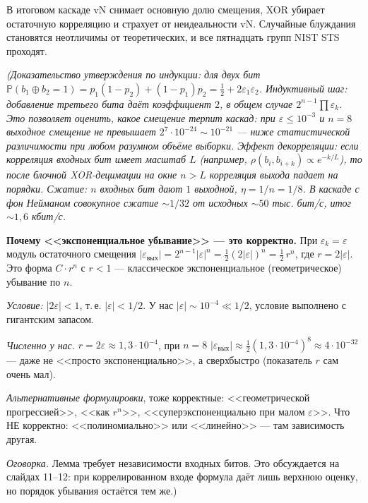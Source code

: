 \documentclass[12pt,a4paper]{extarticle}
\newcommand{\note}[1]{%
  \par
  {\small\color{noteclr}\itshape (#1)}%
  \par}
\begin{document}
В итоговом каскаде vN снимает основную долю смещения, XOR убирает
остаточную корреляцию и страхует от неидеальности vN. Случайные блуждания
становятся неотличимы от теоретических, и все пятнадцать групп NIST STS
проходят.

\note{Доказательство утверждения по индукции: для двух бит
$\mathbb{P}(b_1\oplus b_2=1)=p_1(1-p_2)+(1-p_1)p_2=
\tfrac12+2\varepsilon_1\varepsilon_2$. Индуктивный шаг: добавление третьего
бита даёт коэффициент $2$, в общем случае $2^{n-1}\prod\varepsilon_k$.
Это позволяет оценить, какое смещение терпит каскад: при $\varepsilon\le
10^{-3}$ и $n=8$ выходное смещение не превышает $2^7\cdot 10^{-24}\sim
10^{-21}$ --- ниже статистической различимости при любом разумном объёме
выборки. Эффект декорреляции: если корреляция входных бит имеет масштаб
$L$ (например, $\rho(b_i,b_{i+k})\propto e^{-k/L}$), то после блочной
XOR-децимации на окне $n>L$ корреляция выхода падает на порядки.
Сжатие: $n$ входных бит дают $1$ выходной, $\eta=1/n=1/8$. В каскаде с
фон Нейманом совокупное сжатие $\sim 1/32$ от исходных $\sim 50$ тыс. бит/с,
итог $\sim 1{,}6$ кбит/с.

\medskip
\textbf{Почему <<экспоненциальное убывание>> --- это корректно.}
При $\varepsilon_k=\varepsilon$ модуль остаточного смещения
$|\varepsilon_{\mathrm{вых}}|=2^{n-1}|\varepsilon|^n
=\tfrac12(2|\varepsilon|)^n=\tfrac12\,r^n$, где $r=2|\varepsilon|$.
Это форма $C\cdot r^n$ с $r<1$ --- классическое экспоненциальное
(геометрическое) убывание по $n$.

\emph{Условие:} $|2\varepsilon|<1$, т.\,е. $|\varepsilon|<1/2$. У нас
$|\varepsilon|\sim 10^{-4}\ll 1/2$, условие выполнено с гигантским запасом.

\emph{Численно у нас.} $r=2\varepsilon\approx 1{,}3\cdot 10^{-4}$, при $n=8$
$|\varepsilon_{\mathrm{вых}}|\approx \tfrac12(1{,}3\cdot 10^{-4})^8\approx
4\cdot 10^{-32}$ --- даже не <<просто экспоненциально>>, а сверхбыстро
(показатель $r$ сам очень мал).

\emph{Альтернативные формулировки}, тоже корректные: <<геометрической
прогрессией>>, <<как $r^n$>>, <<суперэкспоненциально при малом
$\varepsilon$>>. Что НЕ корректно: <<полиномиально>> или <<линейно>> ---
там зависимость другая.

\emph{Оговорка.} Лемма требует независимости входных битов. Это
обсуждается на слайдах 11--12: при коррелированном входе формула даёт
лишь верхнюю оценку, но порядок убывания остаётся тем же.}

\end{document}
